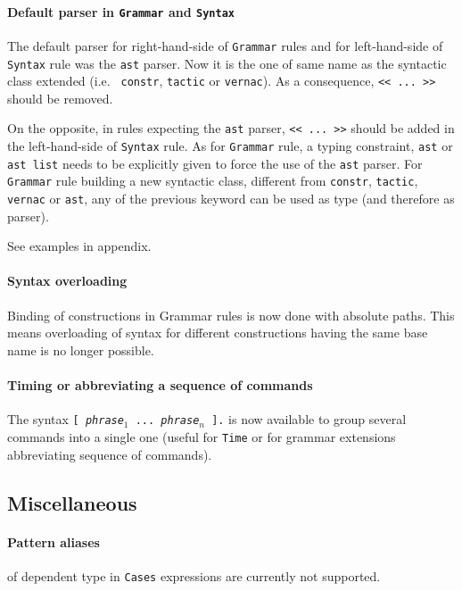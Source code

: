 \documentclass[11pt]{article}
\begin{document}
\paragraph{Default parser in {\tt Grammar} and {\tt Syntax}}
\label{GrammarSyntax}

The default parser for right-hand-side of {\tt Grammar} rules and for
left-hand-side of {\tt Syntax} rule was the {\tt ast} parser.  Now it
is the one of same name as the syntactic class extended (i.e. {\tt
constr}, {\tt tactic} or {\tt vernac}). As a consequence, 
{\verb:<< ... >>:} should be removed.

On the opposite, in rules expecting the {\tt ast} parser,
{\verb:<< ... >>:} should be added in the left-hand-side of {\tt Syntax} rule.
As for {\tt Grammar} rule, a typing constraint, {\tt ast} or {\tt ast
list} needs to be explicitly given to force the use of the {\tt ast}
parser. For {\tt Grammar} rule building a new syntactic class,
different from {\tt constr}, {\tt tactic}, {\tt vernac} or {\tt ast},
any of the previous keyword can be used as type (and therefore as
parser).

See examples in appendix.

\paragraph{Syntax overloading}

 Binding of constructions in Grammar rules is now done with absolute
  paths. This means overloading of syntax for different constructions
  having the same base name is no longer possible.

\paragraph{Timing or abbreviating a sequence of commands}

The syntax {\tt [ {\it phrase$_1$} ... {\it phrase$_n$} ].} is now
available to group several commands into a single one (useful for
{\tt Time} or for grammar extensions abbreviating sequence of commands).

\subsection{Miscellaneous}

\paragraph{Pattern aliases} of dependent type in \verb=Cases=
expressions are currently not supported.
\end{document}
